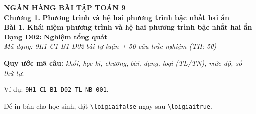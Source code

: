\documentclass[12pt,a4paper]{article}
\newif\ifloigiai
\begin{document}
\begin{center}
{\Large\textbf{NGÂN HÀNG BÀI TẬP TOÁN 9}}\\[3pt]
\textbf{Chương 1. Phương trình và hệ hai phương trình bậc nhất hai ẩn}\\[2pt]
\textbf{Bài 1. Khái niệm phương trình và hệ hai phương trình bậc nhất hai ẩn}\\[2pt]
\textbf{Dạng D02: Nghiệm tổng quát}\\[2pt]
\textit{Mã dạng: 9H1-C1-B1-D02  bài tự luận + 50 câu trắc nghiệm \quad (TH: 50)}
\end{center}
\textbf{Quy ước mã câu:} \textit{khối, học kì, chương, bài, dạng, loại (TL/TN), mức độ, số thứ tự}.\par Ví dụ: \texttt{9H1-C1-B1-D02-TL-NB-001}.\par Để in bản cho học sinh, đặt \verb|\loigiaifalse| ngay sau \verb|\loigiaitrue|.
\end{document}
